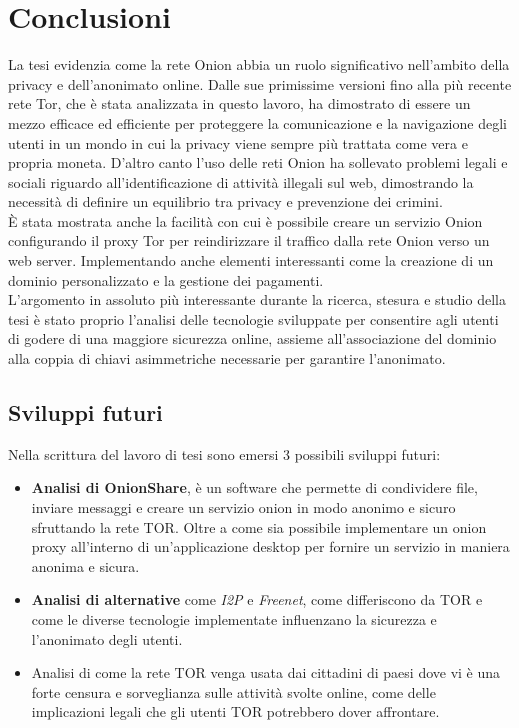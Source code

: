 \newpage

\chapter*{Conclusioni}
La tesi evidenzia come la rete Onion abbia un ruolo significativo nell'ambito della privacy e dell'anonimato online. 
Dalle sue primissime versioni fino alla più recente rete Tor, che è stata analizzata in questo lavoro, ha dimostrato di essere un mezzo efficace ed efficiente per proteggere la comunicazione e la navigazione degli utenti in un mondo in cui la privacy viene sempre più trattata come vera e propria moneta.
D'altro canto l'uso delle reti Onion ha sollevato problemi legali e sociali riguardo all'identificazione di attività illegali sul web, dimostrando la necessità di definire un equilibrio tra privacy e prevenzione dei crimini. \\

È stata mostrata anche la facilità con cui è possibile creare un servizio Onion configurando il proxy Tor per reindirizzare il traffico dalla rete Onion verso un web server. Implementando anche elementi interessanti come la creazione di un dominio personalizzato e la gestione dei pagamenti. \\

L'argomento in assoluto più interessante durante la ricerca, stesura e studio della tesi è stato proprio l'analisi delle tecnologie sviluppate per consentire agli utenti di godere di una maggiore sicurezza online, assieme all'associazione del dominio alla coppia di chiavi asimmetriche necessarie per garantire l'anonimato. 

\section*{Sviluppi futuri}
Nella scrittura del lavoro di tesi sono emersi 3 possibili sviluppi futuri:
\begin{itemize}
    \item \textbf{Analisi di OnionShare}, è un software che permette di condividere file, inviare messaggi e creare un servizio onion in modo anonimo e sicuro sfruttando la rete TOR. Oltre a come sia possibile implementare un onion proxy all'interno di un'applicazione desktop per fornire un servizio in maniera anonima e sicura.
    \item \textbf{Analisi di alternative} come \emph{I2P} e \emph{Freenet}, come differiscono da TOR e come le diverse tecnologie implementate influenzano la sicurezza e l'anonimato degli utenti.
    \item Analisi di come la rete TOR venga usata dai cittadini di paesi dove vi è una forte censura e sorveglianza sulle attività svolte online, come delle implicazioni legali che gli utenti TOR potrebbero dover affrontare. 
\end{itemize}
